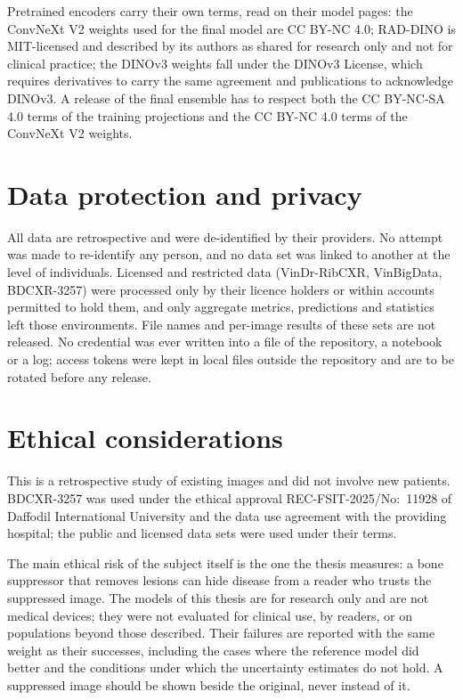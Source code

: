 Pretrained encoders carry their own terms, read on their model pages: the ConvNeXt V2 weights used for the final model are CC BY-NC 4.0;
RAD-DINO is MIT-licensed and described by its authors as shared for research only and not for clinical practice; the DINOv3 weights fall under
the DINOv3 License, which requires derivatives to carry the same agreement and publications to acknowledge DINOv3. A release of the final
ensemble has to respect both the CC BY-NC-SA 4.0 terms of the training projections and the CC BY-NC 4.0 terms of the ConvNeXt V2 weights.

\section{Data protection and privacy}
All data are retrospective and were de-identified by their providers. No attempt was made to re-identify any person, and no data set was
linked to another at the level of individuals. Licensed and restricted data (VinDr-RibCXR, VinBigData, BDCXR-3257) were processed only by
their licence holders or within accounts permitted to hold them, and only aggregate metrics, predictions and statistics left those
environments. File names and per-image results of these sets are not released. No credential was ever written into a file of the repository,
a notebook or a log; access tokens were kept in local files outside the repository and are to be rotated before any release.

\section{Ethical considerations}
This is a retrospective study of existing images and did not involve new patients. BDCXR-3257 was used under the ethical approval
REC-FSIT-2025/No:~11928 of Daffodil International University and the data use agreement with the providing hospital; the public and licensed
data sets were used under their terms. 

The main ethical risk of the subject itself is the one the thesis measures: a bone suppressor that removes lesions can hide disease from a
reader who trusts the suppressed image. The models of this thesis are for research only and are not medical devices; they were not evaluated
for clinical use, by readers, or on populations beyond those described. Their failures are reported with the same weight as their successes,
including the cases where the reference model did better and the conditions under which the uncertainty estimates do not hold. A suppressed image
should be shown beside the original, never instead of it.

